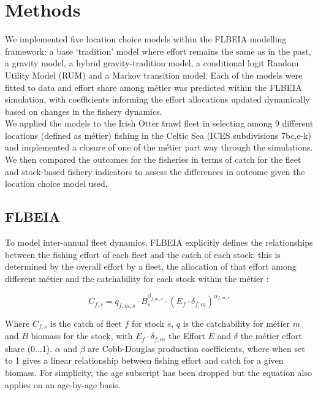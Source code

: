 \documentclass[12pt, halfline, a4paper]{ouparticle}
\begin{document}
\section{Methods}
\label{meth}

We implemented five location choice models within the FLBEIA modelling
framework: a base `tradition' model where effort remains the same as in the
past, a gravity model, a hybrid gravity-tradition model, a conditional logit
Random Utility Model (RUM) and a Markov transition model. Each of the models
were fitted to data and effort share among métier was predicted within the
FLBEIA simulation, with coefficients informing the effort allocations updated
dynamically based on changes in the fishery dynamics.  \\

We applied the models to the Irish Otter trawl fleet in selecting among 9
different locations (defined as métier) fishing in the Celtic Sea (ICES
subdivisions 7bc,e-k) and implemented a closure of one of the métier part way
through the simulations. We then compared the outcomes for the fisheries in
terms of catch for the fleet and stock-based fishery indicators to assess the
differences in outcome given the location choice model used.

\subsection{FLBEIA}

To model inter-annual fleet dynamics, FLBEIA explicitly defines the
relationships between the fishing effort of each fleet and the catch of each
stock: this is determined by the overall effort by a fleet, the allocation of
that effort among different métier and the catchability for each stock within
the métier \citep{Garcia2017a}:

\begin{equation}
 C_{f,s} = q_{f,m,s}\cdot B_{s}^{\beta_{f,m,s}} \cdot \left(E_{f}\cdot
	 \delta_{f,m} \right)^{\alpha_{f,m,s}}	
\end{equation}

Where $C_{f,s}$ is the catch of fleet $f$ for stock $s$, $q$ is the
catchability for métier $m$ and $B$ biomass for the stock, with $E_{f}\cdot
\delta_{f,m}$ the Effort $E$ and $\delta$ the métier effort share (0...1).
$\alpha$ and $\beta$ are Cobb-Douglas production coefficients, where when set
to 1 gives a linear relationship between fishing effort and catch for a given
biomass. For simplicity, the age subscript has been dropped but the equation
also applies on an age-by-age basis. \\
\end{document}
